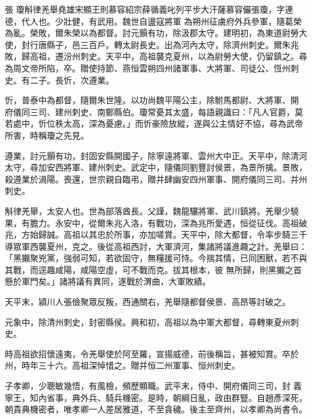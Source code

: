 
\begin{pinyinscope}

 張
 瓊斛律羌舉堯雄宋顯王則慕容紹宗薛循義叱列平步大汗薩慕容儼張瓊，字連德，代人也。少壯健，有武用。魏世自盪寇將軍
 為朔州征虜府外兵參軍，隨葛榮為亂。榮敗，爾朱榮以為都督。討元顥有功，除汲郡太守。建明初，為東道尉勞大使，封行唐縣子，邑三百戶。轉太尉長史。出為河內太守，除濟州刺史。爾朱兆敗，歸高祖，遷汾州刺史。天平中，高祖襲克夏州，以為尉勞大使，仍留鎮之。尋為周文帝所陷，卒。贈使持節、燕恒雲朔四州諸軍事、大將軍、司徒公、恆州刺史。有二子。長忻，次遵業。



 忻，普泰中為都督，隨爾朱世隆。以功尚魏平陽公主，除駙馬都尉、大將軍、開
 府儀同三司、建州刺史、南鄭縣伯。瓊常憂其太盛，每語親識曰：「凡人官爵，莫若處中，忻位秩太高，深為憂慮。」而忻豪險放縱，遂與公主情好不協，尋為武帝所害，時稱瓊之先見。



 遵業，討元顥有功，封固安縣開國子，除寧遠將軍、雲州大中正。天平中，除清河太守，尋加安西將軍、建州刺史。武定中，隨儀同劉豐討侯景，為景所擒。景敗，殺遵業於渦陽。喪還，世宗親自臨弔，贈并肆幽安四州軍事、開府儀同三司、并州刺史。



 斛律羌舉，太安人也。世為部落酋長。父謹，魏龍驤將軍、武川鎮將。羌舉少驍果，有膽力。永安中，從爾朱兆入洛，有戰功，深為兆所愛遇，恒從征伐。高祖破兆，方始歸誠。高祖以其忠於所事，亦加嗟賞。天平中，除大都督，令率步騎三千導眾軍西襲夏州，克之。後從高祖西討，大軍濟河，集諸將議進趣之計。羌舉曰：「黑獺聚兇黨，強弱可知，若欲固守，無糧援可恃。今揣其情，已同困獸，若不與其戰，而逕趣咸陽，咸陽空虛，可不戰而克。拔其根本，彼
 無所歸，則黑獺之首懸於軍門矣。」諸將議有異同，遂戰於渭曲，大軍敗績。



 天平末，潁川人張儉聚眾反叛，西通關右，羌舉隨都督侯景、高昂等討破之。



 元象中，除清州刺史，封密縣侯。興和初，高祖以為中軍大都督，尋轉東夏州刺史。



 時高祖欲招懷遠夷，令羌舉使於阿至羅，宣揚威德，前後稱旨，甚被知賞。卒於州，時年三十六。高祖深悼惜之。贈并恒二州軍事、恒州刺史。



 子孝卿，少聰敏幾悟，有風檢，頻歷顯職。武平末，侍中、開府儀同三司，封
 義寧王，知內省事，典外兵、騎兵機密。是時，朝綱日亂，政由群豎。自趙彥深死，朝貴典機密者，唯孝卿一人差居雅道，不至貪穢。後主至齊州，以孝卿為尚書令。




\end{pinyinscope}
